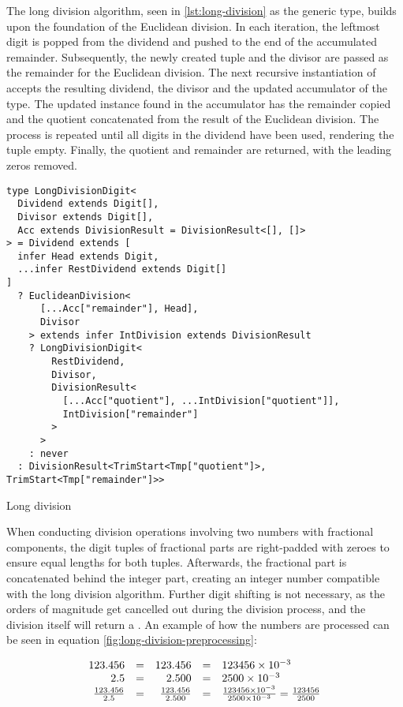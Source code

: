 The long division algorithm, seen in \ref{lst:long-division} as the  generic type, builds upon the foundation of the Euclidean division. In each iteration, the leftmost digit is popped from the dividend and pushed to the end of the accumulated remainder. Subsequently, the newly created tuple and the divisor are passed as the remainder for the Euclidean division. The next recursive instantiation of  accepts the resulting dividend, the divisor and the updated accumulator of the  type. The updated  instance found in the accumulator has the remainder copied and the quotient concatenated from the result of the Euclidean division. The process is repeated until all digits in the dividend have been used, rendering the  tuple empty. Finally, the quotient and remainder are returned, with the leading zeros removed.

\begin{listing}[ht]
  \begin{verbatim}
type LongDivisionDigit<
  Dividend extends Digit[],
  Divisor extends Digit[],
  Acc extends DivisionResult = DivisionResult<[], []>
> = Dividend extends [
  infer Head extends Digit,
  ...infer RestDividend extends Digit[]
]
  ? EuclideanDivision<
      [...Acc["remainder"], Head],
      Divisor
    > extends infer IntDivision extends DivisionResult
    ? LongDivisionDigit<
        RestDividend,
        Divisor,
        DivisionResult<
          [...Acc["quotient"], ...IntDivision["quotient"]],
          IntDivision["remainder"]
        >
      >
    : never
  : DivisionResult<TrimStart<Tmp["quotient"]>, TrimStart<Tmp["remainder"]>>
\end{verbatim}
  \caption{Long division}\label{lst:long-division}
\end{listing}

When conducting division operations involving two numbers with fractional components, the digit tuples of fractional parts are right-padded with zeroes to ensure equal lengths for both tuples. Afterwards, the fractional part is concatenated behind the integer part, creating an integer number compatible with the long division algorithm. Further digit shifting is not necessary, as the orders of magnitude get cancelled out during the division process, and the division itself will return a . An example of how the numbers are processed can be seen in equation \ref{fig:long-division-preprocessing}:

\begin{equation}\label{fig:long-division-preprocessing}
  \begin{array}{r@{\quad=\quad}r@{\quad=\quad}l}
    123.456             & 123.456               & 123456 \times 10^{-3}                                                   \\
    2.5                 & 2.500                 & 2500 \times 10^{-3}                                                     \\
    \frac{123.456}{2.5} & \frac{123.456}{2.500} & \frac{123456 \times 10^{-3}}{2500 \times 10^{-3}} = \frac{123456}{2500}
  \end{array}
\end{equation}

